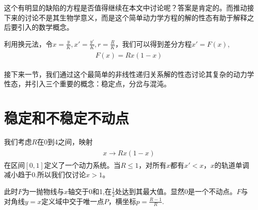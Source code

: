 这个有明显的缺陷的方程是否值得继续在本文中讨论呢？答案是肯定的。而推动接下来的讨论不是其生物学意义，而是这个简单动力学方程的解的性态有助于解释之后要引入的数学概念。
	
利用换元法，令\begin{math}x=\frac{y}{K},x'=\frac{y'}{K},r=\frac{R}{K}\end{math}，我们可以得到差分方程\begin{math}x'=F(x)\end{math},
	\begin{align*}
		\begin{split}
		\label{eq:feedforward}
		F(x)=Rx(1-x)
		\end{split}
	\end{align*}

	接下来一节，我们通过这个最简单的非线性递归关系解的性态讨论其复杂的动力学性态，并引入三个重要的概念：稳定点，分岔与混沌。

\section{稳定和不稳定不动点}
我们考虑\begin{math}R\end{math}在0到4之间，映射
	\begin{align}
		\begin{split}
		\label{eq:feedforward}
		x\rightarrow Rx(1-x)
	\end{split}
	\end{align}
在区间\begin{math}\left [ 0,1 \right ]\end{math}定义了一个动力系统。当\begin{math}R\leqslant 1\end{math}，对所有\begin{math}
x\end{math}都有\begin{math}x'<x\end{math}，\begin{math}x\end{math}的轨道单调减小趋于0.所以我们仅讨论\begin{math}x>1\end{math}。

此时\begin{math}F\end{math}为一抛物线与\begin{math}x\end{math}轴交于0和1,在\begin{math}\frac{1}{2}\end{math}处达到其最大值。显然0是一个不动点。\begin{math}F\end{math}与对角线\begin{math}y=x\end{math}定义域中交于唯一点\begin{math}P\end{math}，横坐标\begin{math}p=\frac{R-1}{R}\end{math}.

